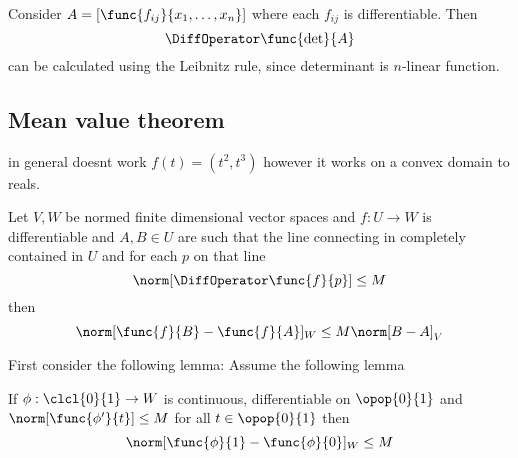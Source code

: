 \begin{example}
    Consider \(A = [\func{f_{ij}}{x_1, \dots , x_n}]\) where each \(f_{ij}\) is differentiable. Then
    \begin{equation*}
        \DiffOperator \func{\det}{A}
    \end{equation*}
    can be calculated using the Leibnitz rule, since determinant is \(n\)-linear function.
\end{example}

\subsection{Mean value theorem}
in general doesnt work \(f(t) = (t^2,t^3)\) however it works on a convex domain to reals.

\begin{theorem}
    Let \(V,W\) be normed finite dimensional vector spaces and \(f: U \to W\) is differentiable and \(A,B \in U\) are such that the line connecting in completely contained in \(U\) and for each \(p\) on that line
    \begin{equation*}
        \norm[\DiffOperator \func{f}{p}] \leq M
    \end{equation*}
    then
    \begin{equation*}
        \norm[\func{f}{B} - \func{f}{A}]_W \leq M \norm[B - A]_V
    \end{equation*}
\end{theorem}
First consider the following lemma:
Assume the following lemma
\begin{lemma} \label{lm:MeanValueTheoremLemma}
    If \(\phi: \clcl{0}{1} \to W\) is continuous, differentiable on \(\opop{0}{1}\) and \(\norm[\func{\phi'}{t}] \leq M\) for all \(t \in \opop{0}{1}\) then
    \begin{equation*}
        \norm[\func{\phi}{1} - \func{\phi}{0}]_W \leq M
    \end{equation*}
\end{lemma}


